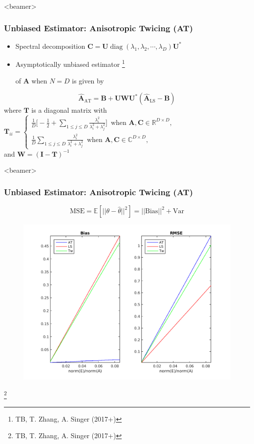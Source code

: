 \documentclass{beamer}
\newcommand\blfootnote[1]{%
  \begingroup
  \renewcommand\thefootnote{}\footnote{#1}%
  \addtocounter{footnote}{-1}%
  \endgroup
}
\newcommand{\bC}{\boldsymbol{C}}
\newcommand{\bT}{\boldsymbol{T}}
\newcommand{\bW}{\boldsymbol{W}}
\newcommand{\bU}{\boldsymbol{U}}
\newcommand{\bI}{\boldsymbol{I}}
\def\bA{\boldsymbol{A}}
\def\bB{\boldsymbol{B}}
\newcommand{\diag}{\operatorname{diag}}
\begin{document}
\begin{frame}<beamer>
\frametitle{Unbiased Estimator: Anisotropic Twicing (AT)}
\begin{itemize}
\item Spectral decomposition $\bC=\bU\diag(\lambda_1,\lambda_2,\cdots,\lambda_D)\bU^*$
\item Asymptotically unbiased estimator \blfootnote{TB, T. Zhang, A. Singer (2017+)} of $\bA$ when $N=D$ is given by
\end{itemize}

\begin{equation*}
\hat{\bA}_{\text{AT}}=\bB+\bU\bW\bU^*(\hat{\bA}_{\text{LS}}-\bB) \nonumber
\end{equation*}
where 
$\bT$ is a diagonal matrix with
$\bT_{ii}=\begin{cases}\frac{1}{D}\Big[-\frac{1}{2}+\sum_{1\leq j\leq 
D}\frac{\lambda_i^2}{\lambda_i^2+\lambda_j^2}\Big]\,\,\,\text{when 
$\bA,\bC\in\mathbb{R}^{D\times D}$},\\\frac{1}{D}\sum_{1\leq j\leq 
D}\frac{\lambda_i^2}{\lambda_i^2+\lambda_j^2}
\,\,\,\text{when $\bA,\bC\in\mathbb{C}^{D\times D}$},
\end{cases}$\\
and $\bW=(\bI-\bT)^{-1}$

\end{frame}


\begin{frame}<beamer>
\frametitle{Unbiased Estimator: Anisotropic Twicing (AT) }
\begin{equation*}
\label{eqn:biasvar}
\text{MSE}=\mathbb{E}[||\theta-\hat{\theta}||^2] = ||\text{Bias}||^2 + \text{Var} \nonumber
\end{equation*}
\begin{figure}[!htbp]
\begin{center}
\includegraphics[scale=0.35]{figures/anis_bias_family_few.png}
\end{center}
\end{figure}\blfootnote{TB, T. Zhang, A. Singer (2017+)}
\end{frame}
\end{document}
